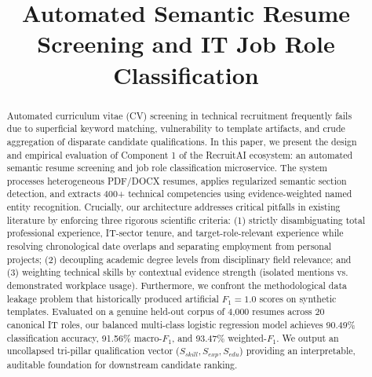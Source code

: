 \documentclass[conference]{IEEEtran}
\begin{document}
\title{Automated Semantic Resume Screening and IT Job Role Classification}

\author{
}

\maketitle

\begin{abstract}
Automated curriculum vitae (CV) screening in technical recruitment frequently fails due to superficial keyword matching, vulnerability to template artifacts, and crude aggregation of disparate candidate qualifications. In this paper, we present the design and empirical evaluation of Component 1 of the RecruitAI ecosystem: an automated semantic resume screening and job role classification microservice. The system processes heterogeneous PDF/DOCX resumes, applies regularized semantic section detection, and extracts 400+ technical competencies using evidence-weighted named entity recognition. Crucially, our architecture addresses critical pitfalls in existing literature by enforcing three rigorous scientific criteria: (1) strictly disambiguating total professional experience, IT-sector tenure, and target-role-relevant experience while resolving chronological date overlaps and separating employment from personal projects; (2) decoupling academic degree levels from disciplinary field relevance; and (3) weighting technical skills by contextual evidence strength (isolated mentions vs. demonstrated workplace usage). Furthermore, we confront the methodological data leakage problem that historically produced artificial $F_1=1.0$ scores on synthetic templates. Evaluated on a genuine held-out corpus of 4,000 resumes across 20 canonical IT roles, our balanced multi-class logistic regression model achieves 90.49\% classification accuracy, 91.56\% macro-$F_1$, and 93.47\% weighted-$F_1$. We output an uncollapsed tri-pillar qualification vector ($S_{skill}, S_{exp}, S_{edu}$) providing an interpretable, auditable foundation for downstream candidate ranking.
\end{abstract}
\end{document}
